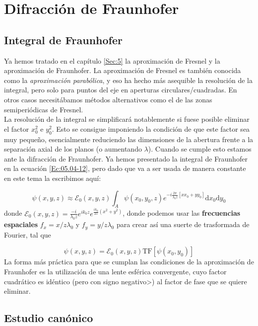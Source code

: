 \documentclass[12pt,a4paper]{book}
\numberwithin{equation}{section}
\numberwithin{figure}{section}
\newcommand{\ccorchetes}[1]{\left[ #1  \right]}
\newcommand{\D}{\mathrm{d}}
\newcommand{\1}{_{(1)}}
\newcommand{\2}{_{(2)}}
\newcommand{\TF}{\mathrm{TF}}
\newcommand{\Ecal}{\mathcal{E}}
\theoremstyle{definition}
\begin{document}
\chapter{Difracción de Fraunhofer}
\section{Integral de Fraunhofer}

Ya hemos tratado en el capítulo \ref{Sec:5} la aproximación de Fresnel y la aproximación de Fraunhofer. La aproximación de Fresnel es también conocida como la \textit{aproximación parabólica}, y eso ha hecho más asequible la resolución de la integral, pero solo para puntos del eje en aperturas circulares/cuadradas. En otros casos necesitábamos métodos alternativos como el de las zonas semiperiódicas de Fresnel. \\

La resolución de la integral se simplificará notablemente si fuese posible eliminar el factor $x_0^2$ e $y_0^2$. Esto se consigue imponiendo la condición de que este factor sea muy pequeño, esencialmente reduciendo las dimensiones de la abertura frente a la separación axial de los planos (o aumentando $\lambda$). Cuando se cumple esto estamos ante la difracción de Fraunhofer. Ya hemos presentado la integral de Fraunhofer en la ecuación \ref{Ec:05.04-12}, pero dado que va a ser usada de manera constante en este tema la escribimos aquí:

\begin{equation}
     \psi (x,y,z)  \approx \Ecal_0 (x,y,z) \int_A \psi (x_0,y_0,z) e^{-i \frac{2\pi}{\lambda_0 z} \ccorchetes{xx_0+yy_0}} \D x_0 \D y_0
\end{equation}
donde $\Ecal_0(x,y,z) = \frac{-i}{\lambda_0 z} e^{ik_0z} e^{\frac{ik_0}{2z}(x^2+y^2)}$, donde podemos usar las \textbf{frecuencias espaciales} $f_x=x/z\lambda_0$ 
y $f_y=y/z\lambda_0$ para crear así una suerte de trasformada de Fourier, tal que

\begin{equation}
    \psi (x,y,z) = \Ecal_0(x,y,z) \TF [\psi (x_0,y_0)]
\end{equation}
La forma más práctica para que se cumplan las condiciones de la aproximación de Fraunhofer es la utilización de una lente esférica convergente, cuyo factor cuadrático es idéntico (pero con signo negativo>) al factor de fase que se quiere eliminar. 

\section{Estudio canónico}
\end{document}
